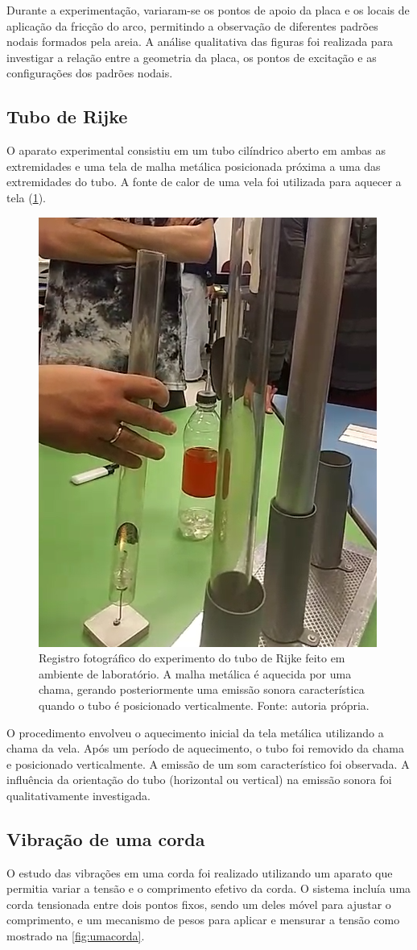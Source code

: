 Durante a experimentação, variaram-se os pontos de apoio da placa e os locais de aplicação da fricção do arco, permitindo a observação de diferentes padrões nodais formados pela areia. A análise qualitativa das figuras foi realizada para investigar a relação entre a geometria da placa, os pontos de excitação e as configurações dos padrões nodais.

\subsection{Tubo de Rijke}
O aparato experimental consistiu em um tubo cilíndrico aberto em ambas as extremidades e uma tela de malha metálica posicionada próxima a uma das extremidades do tubo. A fonte de calor de uma vela foi utilizada para aquecer a tela (\cref{fig:rijke}).

\begin{figure}[H]
    \centering
    \includegraphics[width=0.25\linewidth]{fig/rijke.png}
    \caption{Registro fotográfico do experimento do tubo de Rijke feito em ambiente de laboratório. A malha metálica é aquecida por uma chama, gerando posteriormente uma emissão sonora característica quando o tubo é posicionado verticalmente. Fonte: autoria própria.}
    \label{fig:rijke}
\end{figure}

O procedimento envolveu o aquecimento inicial da tela metálica utilizando a chama da vela. Após um período de aquecimento, o tubo foi removido da chama e posicionado verticalmente. A emissão de um som característico foi observada. A influência da orientação do tubo (horizontal ou vertical) na emissão sonora foi qualitativamente investigada.

\subsection{Vibração de uma corda}
O estudo das vibrações em uma corda foi realizado utilizando um aparato que permitia variar a tensão e o comprimento efetivo da corda. O sistema incluía uma corda tensionada entre dois pontos fixos, sendo um deles móvel para ajustar o comprimento, e um mecanismo de pesos para aplicar e mensurar a tensão como mostrado na \cref{fig:umacorda}.

